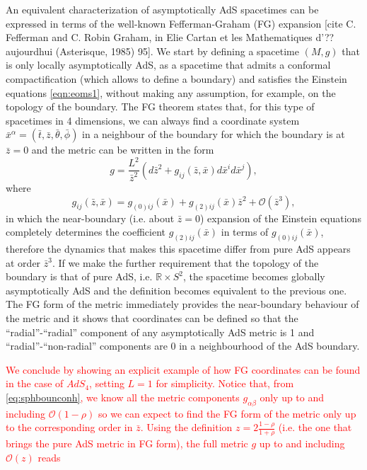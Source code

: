 \documentclass[a4paper,11pt]{article}
\numberwithin{equation}{section}
\begin{document}
An equivalent characterization of asymptotically AdS spacetimes can be expressed in terms of the well-known Fefferman-Graham (FG) expansion [cite C. Fefferman and C. Robin Graham, in Elie Cartan et les Mathematiques d'??aujourdhui (Asterisque, 1985) 95]. We start by defining a spacetime $(M,g)$  that is only locally asymptotically AdS, as a spacetime that admits a conformal compactification (which allows to define a boundary) and satisfies the Einstein equations \eqref{eqn:eoms1}, without making any assumption, for example, on the topology of the boundary. The FG theorem states that, for this type of spacetimes in 4 dimensions, we can always find a coordinate system $\bar{x}^\alpha=(\bar{t},\bar{z},\bar{\theta},\bar{\phi})$ in a neighbour of the boundary for which the boundary is at $\bar{z}=0$ and the metric can be written in the form
\begin{equation}
\label{eqn:FGmetric}
g=\frac{L^2}{\bar{z}^2}(d\bar{z}^2+g_{ij}(\bar{z},\bar{x})d\bar{x}^id\bar{x}^j),
\end{equation}
where 
\begin{equation}
\label{eqn:FGbdymetric}
g_{ij}(\bar{z},\bar{x})=g_{(0)ij}(\bar{x})+g_{(2)ij}(\bar{x})\bar{z}^2+\mathcal{O}(\bar{z}^3),
\end{equation}
in which the near-boundary (i.e. about $\bar{z}=0$) expansion of the Einstein equations completely determines the coefficient $g_{(2)ij}(\bar{x})$ in terms of $g_{(0)ij}(\bar{x})$, therefore the dynamics that makes this spacetime differ from pure AdS appears at order $\bar{z}^3$. If we make the further requirement that the topology of the boundary is that of pure AdS, i.e. $\mathbb{R}\times S^2$, the spacetime becomes globally asymptotically AdS and the definition becomes equivalent to the previous one. The FG form of the metric immediately provides the near-boundary behaviour of the metric and it shows that coordinates can be defined so that the ``radial''-``radial'' component of any asymptotically AdS metric is 1 and ``radial''-``non-radial'' components are 0 in a neighbourhood of the AdS boundary.

\textcolor{red}{We conclude by showing an explicit example of how FG coordinates can be found in the case of $AdS_4$, setting $L=1$ for simplicity. Notice that, from  \eqref{eq:sphbounconh}, we know all the metric components $g_{\alpha\beta}$ only up to and including $\mathcal{O}(1-\rho)$ so we can expect to find the FG form of the metric only up to the corresponding order in $\bar{z}$.
Using the definition $z=2\frac{1-\rho}{1+\rho}$ (i.e. the one that brings the pure AdS metric in FG form), the full metric $g$ up to and including $\mathcal{O}(z)$ reads}
\end{document}

